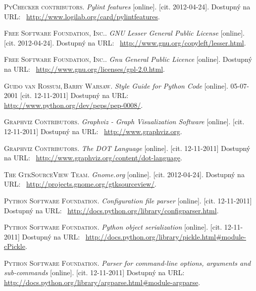 \documentclass[11pt,oneside,final]{fithesis2}
\begin{document}
\begin{thebibliography}{99}
    \textsc{PyChecker contributors}.
    \textit{Pylint features} [online].
    [cit. \mbox{2012-04-24}].
    Dostupný na URL:~
    \url{http://www.logilab.org/card/pylintfeatures}.

    \textsc{Free Software Foundation, Inc.}.
    \textit{GNU Lesser General Public License} [online].
    [cit. \mbox{2012-04-24}].
    Dostupný na URL:~
    \url{http://www.gnu.org/copyleft/lesser.html}.   

    \textsc{Free Software Foundation, Inc.}.
    \textit{Gnu General Public Licence} [online].
    Dostupný na URL:~
    \url{http://www.gnu.org/licenses/gpl-2.0.html}.   

    \textsc{Guido van Rossum,\,Barry Warsaw}.
    \textit{Style Guide for Python Code} [online].
    05-07-2001
    [cit. 12-11-2011]
    Dostupný na URL:~
    \url{http://www.python.org/dev/peps/pep-0008/}. 
        

    \textsc{Graphviz Contributors}.
    \textit{Graphviz - Graph Visualization Software} [online].
    [cit. 12-11-2011]
    Dostupný na URL:~
    \url{http://www.graphviz.org}.    
                
        
    \textsc{Graphviz Contributors}.
    \textit{The DOT Language} [online].
    [cit. 12-11-2011]
    Dostupný na URL:~
    \url{http://www.graphviz.org/content/dot-language}.    
        
    \textsc{The GtkSourceView Team}.
    \textit{Gnome.org} [online].
    [cit. \mbox{2012-04-24}].
    Dostupný na URL:~
    \url{http://projects.gnome.org/gtksourceview/}.    
        
    \textsc{Python Software Foundation}.
	\textit{Configuration file parser} [online].
    [cit. 12-11-2011]
    Dostupný na URL:~
    \url{http://docs.python.org/library/configparser.html}.    
        
    \textsc{Python Software Foundation}.
    \textit{Python object serialization} [online].
    [cit. 12-11-2011]
    Dostupný na URL:~
    \url{http://docs.python.org/library/pickle.html#module-cPickle}.    
    
    \textsc{Python Software Foundation}.
    \textit{Parser for command-line options, arguments and sub-commands} [online].
    [cit. 12-11-2011]
    Dostupný na URL:~
    \url{http://docs.python.org/library/argparse.html#module-argparse}.  


\end{thebibliography}
\end{document}
